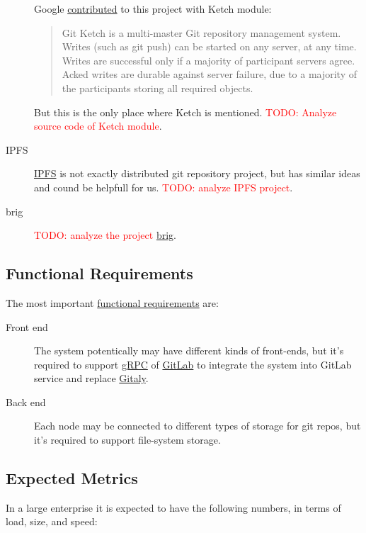 \documentclass[nonacm=true]{acmart}
\newcommand{\todo}[1]{\textcolor{red}{TODO: #1}}
\begin{document}
\begin{description}
    Google \href{https://www.eclipse.org//lists/jgit-dev/msg03073.html}{contributed} to this project with Ketch module:
    \begin{quote}
      Git Ketch is a multi-master Git repository management system. Writes
      (such as git push) can be started on any server, at any time. Writes
      are successful only if a majority of participant servers agree.
      Acked writes are durable against server failure, due to a majority of
      the participants storing all required objects.
    \end{quote}
    But this is the only place where Ketch is mentioned. \todo{Analyze source code of Ketch module}.
  \item[IPFS]
    \href{https://ipfs.io/}{IPFS} is not exactly distributed git repository project, but has similar ideas
    and cound be helpfull for us. \todo{analyze IPFS project}.
  \item[brig]
    \todo{analyze the project} \href{https://github.com/sahib/brig}{brig}.
\end{description}

\subsection{Functional Requirements}
\label{sec:nfr}

The most important \href{https://en.wikipedia.org/wiki/Functional_requirement}{functional requirements} are:

\begin{description}
  \item[Front end]
    The system potentically may have different kinds of front-ends,
    but it's required to support \href{https://grpc.io/}{gRPC}
    of \href{https://about.gitlab.com/}{GitLab} to integrate the system
    into GitLab service and replace
    \href{https://docs.gitlab.com/ee/administration/gitaly/}{Gitaly}.
  \item[Back end]
    Each node may be connected to different types of storage for git repos,
    but it's required to support file-system storage.
\end{description}

\subsection{Expected Metrics}
\label{ref:metrics}

In a large enterprise it is expected to have the following
numbers, in terms of load, size, and speed:
\end{document}
